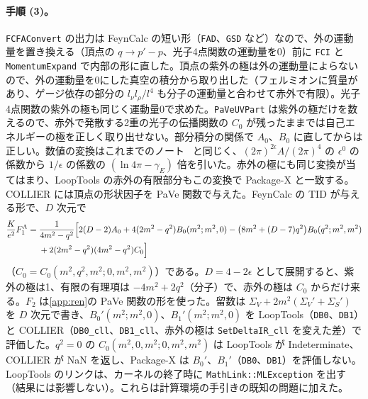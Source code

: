 \documentclass[a4paper,10pt]{ltjsarticle}
\begin{document}
\paragraph{手順 (3)。}\texttt{FCFAConvert} の出力は FeynCalc の短い形（\texttt{FAD}、\texttt{GSD} など）なので、外の運動量を置き換える（頂点の $q\to p'-p$、光子4点関数の運動量を0）前に \texttt{FCI} と \texttt{MomentumExpand} で内部の形に直した。頂点の紫外の極は外の運動量によらないので、外の運動量を0にした真空の積分から取り出した（フェルミオンに質量があり、ゲージ依存の部分の $l_\nu l_\rho/l^4$ も分子の運動量と合わせて赤外で有限）。光子4点関数の紫外の極も同じく運動量0で求めた。\texttt{PaVeUVPart} は紫外の極だけを数えるので、赤外で発散する2重の光子の伝播関数の $C_0$ が残ったままでは自己エネルギーの極を正しく取り出せない。部分積分の関係で $A_0$、$B_0$ に直してからは正しい。数値の変換はこれまでのノート~\cite{yukawanote} と同じく、$(2\pi)^{2\epsilon}A/(2\pi)^4$ の $\epsilon^0$ の係数から $1/\epsilon$ の係数の $(\ln4\pi-\gamma_E)$ 倍を引いた。赤外の極にも同じ変換が当てはまり、LoopTools の赤外の有限部分もこの変換で Package-X と一致する。COLLIER には頂点の形状因子を PaVe 関数で与えた。FeynCalc の TID が与える形で、$D$ 次元で
\begin{equation*}
\begin{aligned}
\frac{K}{e^2}F_1^\Lambda={}&\frac{1}{4m^2-q^2}\Bigl[2(D-2)A_0+4(2m^2-q^2)B_0(m^2;m^2,0)-\bigl(8m^2+(D-7)q^2\bigr)B_0(q^2;m^2,m^2)\\
&+2(2m^2-q^2)(4m^2-q^2)C_0\Bigr]
\end{aligned}
\end{equation*}
（$C_0=C_0(m^2,q^2,m^2;0,m^2,m^2)$）である。$D=4-2\epsilon$ として展開すると、紫外の極は1、有限の有理項は $-4m^2+2q^2$（分子）で、赤外の極は $C_0$ からだけ来る。$F_2$ は\ref{app:ren}の PaVe 関数の形を使った。留数は $\Sigma_V+2m^2(\Sigma_V'+\Sigma_S')$ を $D$ 次元で書き、$B_0'(m^2;m^2,0)$、$B_1'(m^2;m^2,0)$ を LoopTools（\texttt{DB0}、\texttt{DB1}）と COLLIER（\texttt{DB0\_cll}、\texttt{DB1\_cll}、赤外の極は \texttt{SetDeltaIR\_cll} を変えた差）で評価した。$q^2=0$ の $C_0(m^2,0,m^2;0,m^2,m^2)$ は LoopTools が Indeterminate、COLLIER が NaN を返し、Package-X は $B_0'$、$B_1'$（\texttt{DB0}、\texttt{DB1}）を評価しない。LoopTools のリンクは、カーネルの終了時に \texttt{MathLink::MLException} を出す（結果には影響しない）。これらは計算環境の手引きの既知の問題に加えた。
\end{document}

